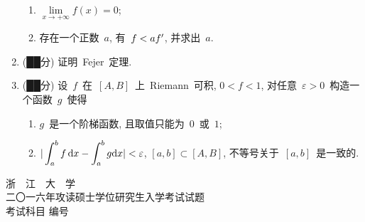 \documentclass[UTF8,a4paper,11pt]{article}
\begin{document}
\begin{enumerate}
	      \begin{enumerate}
		      \item $\lim\limits_{x\to+\infty} f(x)=0$;
		      \item 存在一个正数~$a$, 有~$f<af\rq{}$, 并求出~$a$.
	      \end{enumerate}
	      \vspace{2em}
	\item (██分) 证明~Fejer~定理.
	      \vspace{2em}
	\item (██分) 设~$f$~在~$[A,B]$~上~Riemann~可积, $0<f<1$, 对任意~$\varepsilon>0$~构造一个函数~$g$~使得
	      \begin{enumerate}
		      \item $g$~是一个阶梯函数, 且取值只能为~$0$~或~$1$;
		      \item $\displaystyle |\int_a^b f\,\mathrm{d}x-\int_a^b g\mathrm{d}x|<\varepsilon$, $[a,b]\subset[A,B]$, 不等号关于~$[a,b]$~是一致的.
	      \end{enumerate}
	      \vspace{2em}
\end{enumerate}

\newpage
\setcounter{page}{1}

\begin{center}
	{\Huge 浙~~江~~大~~学}\\
	\setlength{\parskip}{5pt}
	{\Large 二〇一六年攻读硕士学位研究生入学考试试题}\\
	\setlength{\parskip}{10 pt}
	{\Large 考试科目\underline{} 编号\underline{}}
\end{center}
\end{document}
